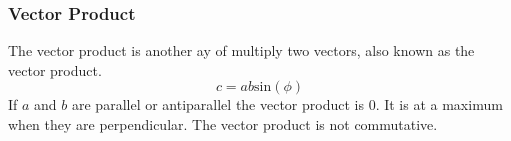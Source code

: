 \documentclass[12pt]{report}
\begin{document}
\begin{flushleft}
\subsubsection*{Vector Product}

The vector product is another ay of multiply two vectors, also known as the vector product.
\[c = ab\mathrm{sin}(\phi)\]
If \(a\) and \(b\) are parallel or antiparallel the vector product is \(0\). It is at a maximum
when they are perpendicular. The vector product is not commutative.


\end{flushleft}
\end{document}
